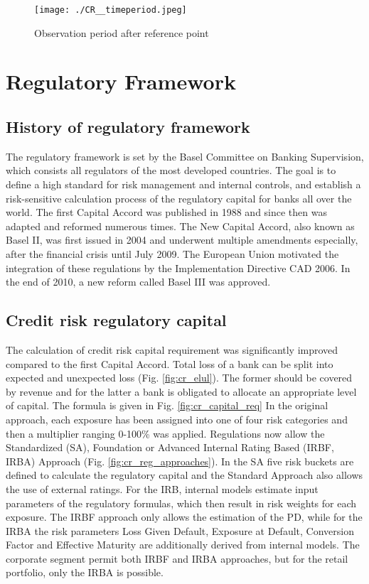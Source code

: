 \begin{figure}[H]
	\centering
	\texttt{[image: ./CR\_\_timeperiod.jpeg]}
    \caption{Observation period after reference point}
    \label{fig:cr_timeperiod}
\end{figure}

\section{Regulatory Framework}

\subsection{History of regulatory framework}

The regulatory framework is set by the Basel Committee on Banking Supervision, which consists all regulators of the most developed countries. The goal is to define a high standard for risk management and internal controls, and establish a risk-sensitive calculation process of the regulatory capital for banks all over the world. The first Capital Accord was published in 1988 and since then was adapted and reformed numerous times. The New Capital Accord, also known as Basel II, was first issued in 2004 and underwent multiple amendments especially, after the financial crisis until July 2009. The European Union motivated the integration of these regulations by the Implementation Directive CAD 2006. In the end of 2010, a new reform called Basel III was  approved. 

\subsection{Credit risk regulatory capital}

The calculation of credit risk capital requirement was significantly improved compared to the first Capital Accord. Total loss of a bank can be split into expected and unexpected loss (Fig. \ref{fig:cr_elul}). The former should be covered by revenue and for the latter a bank is obligated to allocate an appropriate level of capital. The formula is given in Fig. \ref{fig:cr_capital_req} In the original approach, each exposure has been assigned into one of four risk categories and then a multiplier ranging 0-100\% was applied. Regulations now allow the Standardized (SA), Foundation or Advanced Internal Rating Based (IRBF, IRBA) Approach (Fig. \ref{fig:cr_reg_approaches}). In the SA five risk buckets are defined to calculate the regulatory capital and the Standard Approach also allows the use of external ratings. For the IRB, internal models estimate input parameters of the regulatory formulas, which then result in risk weights for each exposure. The IRBF approach only allows the estimation of the PD, while for the IRBA the risk parameters Loss Given Default, Exposure at Default, Conversion Factor and Effective Maturity are additionally derived from internal models. The corporate segment permit both IRBF and IRBA approaches, but for the retail portfolio, only the IRBA is possible.

